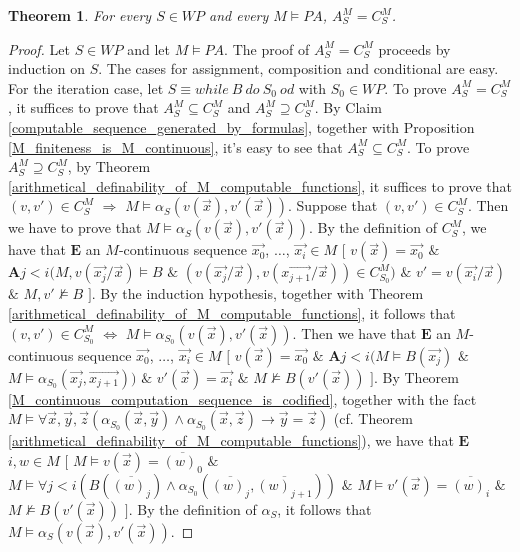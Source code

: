 \documentclass[a4paper,11pt]{article}
\begin{document}
\newtheorem{equivalence_of_the_continuous_semantics_and_the_X_semantics_of_while_programs}[definition_of_continuous_sequences]{Theorem}
\begin{equivalence_of_the_continuous_semantics_and_the_X_semantics_of_while_programs}
  For every $S\in WP$ and every $M\models PA$, $A_S^M = C_S^M$.
\end{equivalence_of_the_continuous_semantics_and_the_X_semantics_of_while_programs}
\begin{proof}
Let $S\in WP$ and let $M\models PA$. The proof of $A_S^M = C_S^M$ proceeds by induction on $S$. The cases for assignment, composition and conditional are easy. For the iteration case, let $S\equiv while\ B\ do\ S_0\ od$ with $S_0\in WP$. To prove $A_S^M = C_S^M$, it suffices to prove that $A_S^M \subseteq C_S^M$ and $A_S^M \supseteq C_S^M$. By Claim \ref{computable_sequence_generated_by_formulas}, together with Proposition \ref{M_finiteness_is_M_continuous}, it's easy to see that $A_S^M \subseteq C_S^M$. To prove $A_S^M \supseteq C_S^M$, by Theorem \ref{arithmetical_definability_of_M_computable_functions}, it suffices to prove that $(v,v')\in C_S^M$ $\Rightarrow$ $M \models \alpha_S(v(\vec{x}), v'(\vec{x}))$. Suppose that $(v,v')\in C_S^M$. Then we have to prove that $M \models \alpha_S(v(\vec{x}), v'(\vec{x}))$. By the definition of $C_S^M$, we have that $\textbf{E}$ an $M$-continuous sequence $\vec{x_0}$, $\ldots$, $\vec{x_i} \in M$ $[$ $v(\vec{x}) = \vec{x_0}$ $\&$ $\textbf{A} j < i ( M,v(\vec{x_j}/\vec{x})\models B$ $\&$ $(v(\vec{x_j}/\vec{x}), v(\vec{x_{j+1}}/\vec{x}))\in C_{S_0}^M ) $ $\&$ $v' = v(\vec{x_i}/\vec{x})$ $\&$ $M,v'\not\models B$ $]$. By the induction hypothesis, together with Theorem \ref{arithmetical_definability_of_M_computable_functions}, it follows that $(v,v')\in C_{S_0}^M$ $\Leftrightarrow$ $M \models \alpha_{S_0}(v(\vec{x}), v'(\vec{x}))$. Then we have that $\textbf{E}$ an $M$-continuous sequence $\vec{x_0}$, $\ldots$, $\vec{x_i} \in M$ $[$ $v(\vec{x}) = \vec{x_0}$ $\&$ $\textbf{A} j < i ( M \models B(\vec{x_j})$ $\&$ $M \models \alpha_{S_0}(\vec{x_j}, \vec{x_{j+1}}) )$ $\&$ $v'(\vec{x}) = \vec{x_i}$ $\&$ $M\not\models B(v'(\vec{x}))$ $]$. By Theorem \ref{M_continuous_computation_sequence_is_codified}, together with the fact $M\models \forall \vec{x},\vec{y},\vec{z}(\alpha_{S_0}(\vec{x},\vec{y}) \wedge \alpha_{S_0}(\vec{x},\vec{z}) \rightarrow \vec{y} = \vec{z})$ (cf. Theorem \ref{arithmetical_definability_of_M_computable_functions}), we have that $\textbf{E}$ $i,w\in M$ $[$ $M\models v(\vec{x}) = \overline{(w)_0}$ $\&$ $M\models \forall j<i ( B(\overline{(w)_j}) \wedge \alpha_{S_0}(\overline{(w)_j}, \overline{(w)_{j+1}}) )$ $\&$ $M\models v'(\vec{x}) = \overline{(w)_i}$ $\&$ $M\not\models B(v'(\vec{x}))$ $]$. By the definition of $\alpha_S$, it follows that $M \models \alpha_S(v(\vec{x}), v'(\vec{x}))$.
\end{proof}
\end{document}
